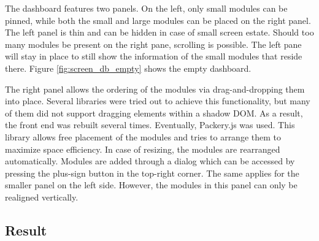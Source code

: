         The dashboard features two panels. On the left, only small modules can be pinned, while both the small and large modules can be placed on the right panel. The left panel is thin and can be hidden in case of small screen estate. Should too many modules be present on the right pane, scrolling is possible. The left pane will stay in place to still show the information of the small modules that reside there. Figure \ref{fig:screen_db_empty} shows the empty dashboard.

        The right panel allows the ordering of the modules via drag-and-dropping them into place. Several libraries were tried out to achieve this functionality, but many of them did not support dragging elements within a shadow DOM. As a result, the front end was rebuilt several times. Eventually, Packery.js was used. This library allows free placement of the modules and tries to arrange them to maximize space efficiency. In case of resizing, the modules are rearranged automatically. Modules are added through a dialog which can be accessed by pressing the plus-sign button in the top-right corner. The same applies for the smaller panel on the left side. However, the modules in this panel can only be realigned vertically.

    \subsection{Result}

    